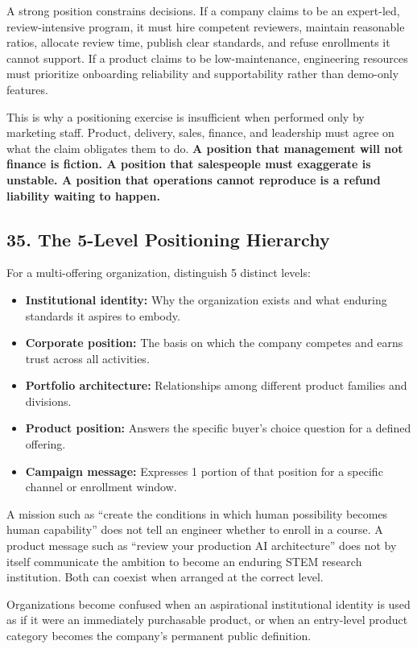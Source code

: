 A strong position constrains decisions. If a company claims to be an expert-led, review-intensive program, it must hire competent reviewers, maintain reasonable ratios, allocate review time, publish clear standards, and refuse enrollments it cannot support. If a product claims to be low-maintenance, engineering resources must prioritize onboarding reliability and supportability rather than demo-only features.

This is why a positioning exercise is insufficient when performed only by marketing staff. Product, delivery, sales, finance, and leadership must agree on what the claim obligates them to do. \textbf{A position that management will not finance is fiction. A position that salespeople must exaggerate is unstable. A position that operations cannot reproduce is a refund liability waiting to happen.}

\subsection*{35. The 5-Level Positioning Hierarchy}

For a multi-offering organization, distinguish 5 distinct levels:

\begin{itemize}
    \item \textbf{Institutional identity:} Why the organization exists and what enduring standards it aspires to embody.
    \item \textbf{Corporate position:} The basis on which the company competes and earns trust across all activities.
    \item \textbf{Portfolio architecture:} Relationships among different product families and divisions.
    \item \textbf{Product position:} Answers the specific buyer's choice question for a defined offering.
    \item \textbf{Campaign message:} Expresses 1 portion of that position for a specific channel or enrollment window.
\end{itemize}

A mission such as ``create the conditions in which human possibility becomes human capability'' does not tell an engineer whether to enroll in a course. A product message such as ``review your production AI architecture'' does not by itself communicate the ambition to become an enduring STEM research institution. Both can coexist when arranged at the correct level.

Organizations become confused when an aspirational institutional identity is used as if it were an immediately purchasable product, or when an entry-level product category becomes the company's permanent public definition.

